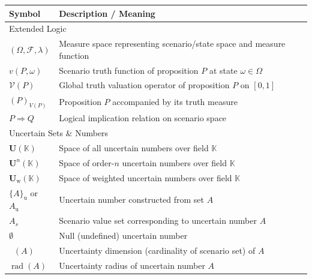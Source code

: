 \documentclass[a4paper,12pt, twoside]{memoir}
\DeclareMathOperator{\dimU}{\dim_U}
\DeclareMathOperator{\w}{w}
\DeclareMathOperator{\rad}{rad}
\newcommand{\ddclmd}{\mathcal{V}} %
\begin{document}
\begin{table}[h!]
	\centering
	\renewcommand{\arraystretch}{1.3}
	\begin{tabular}{p{3.5cm} p{11cm}}
		\toprule
		Symbol                               & Description / Meaning                                                      \\
		\midrule
		\multicolumn{2}{l}{Extended Logic}                                                                                \\
		$(\Omega, \mathcal{F}, \lambda)$     & Measure space representing scenario/state space and measure function       \\
		$v(P, \omega)$                       & Scenario truth function of proposition $P$ at state $\omega \in \Omega$    \\
		$\ddclmd(P)$                         & Global truth valuation operator of proposition $P$ on $[0, 1]$             \\
		$(P)_{V(P)}$                         & Proposition $P$ accompanied by its truth measure                           \\
		$P \Rightarrow Q$                    & Logical implication relation on scenario space                             \\
		\midrule
		\multicolumn{2}{l}{Uncertain Sets \& Numbers}                                                                     \\
		$\mathbf{U}(\mathbb{K})$             & Space of all uncertain numbers over field $\mathbb{K}$                     \\
		$\mathbf{U}^n(\mathbb{K})$           & Space of order-$n$ uncertain numbers over field $\mathbb{K}$               \\
		$\mathbf{U}_{\w}(\mathbb{K})$        & Space of weighted uncertain numbers over field $\mathbb{K}$                \\
		$\{A\}_\mathrm{u}$ or $A_\mathrm{u}$ & Uncertain number constructed from set $A$                                  \\
		$A_s$                                & Scenario value set corresponding to uncertain number $A$                   \\
		$\emptyset$                          & Null (undefined) uncertain number                                          \\
		$\dimU(A)$                           & Uncertainty dimension (cardinality of scenario set) of $A$                 \\
		$\rad(A)$                            & Uncertainty radius of uncertain number $A$                                 \\

\end{tabular}
\end{table}
\end{document}
